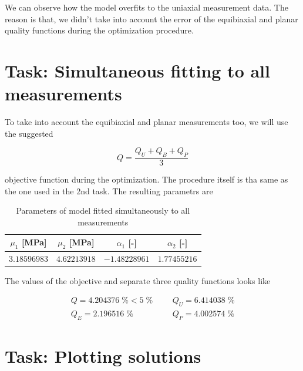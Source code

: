 \documentclass[12pt,a4paper]{article}
\begin{document}
We can observe how the model overfits to the uniaxial measurement data. The reason is that, we didn't take into account the error of the equibiaxial and planar quality functions during the optimization procedure.

\section{Task: Simultaneous fitting to all measurements}

To take into account the equibiaxial and planar measurements too, we will use the suggested 

$$
Q = \frac{Q_U + Q_B + Q_P}{3}
$$

objective function during the optimization. The procedure itself is tha same as the one used in the 2nd task. The resulting parametrs are

\begin{table}[H]
    \caption{Parameters of model fitted simultaneously to all measurements}
    \centering
    \begin{tabular}{|c|c|c|c|}
    \hline
    $\mu_1$ [MPa]& $\mu_2$ [MPa]& $\alpha_1$ [-]& $\alpha_2$ [-]\\ \hline
    $3.18596983$   & $4.62213918$   & $-1.48228961$ & $1.77455216$   \\ \hline
    \end{tabular}
\end{table}

The values of the objective and separate three quality functions looks like

$$
\begin{array}{llll}
    Q = 4.204376\;\% < 5\;\%&&& Q_U = 6.414038\;\% \\
    Q_E = 2.196516\;\% &&& Q_P = 4.002574\;\%
\end{array}
$$

\section{Task: Plotting solutions}
\end{document}

